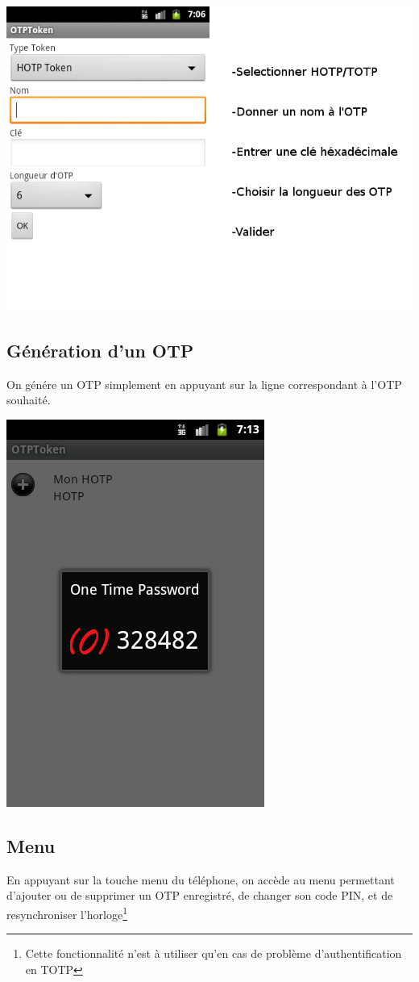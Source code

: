 \documentclass{../../../../res/univ-projet}
\begin{document}
\includegraphics[scale=0.5]{firstotp.png}

\subsection{Génération d'un OTP}
On génére un OTP simplement en appuyant sur la ligne correspondant à l'OTP souhaité.

\includegraphics[scale=0.5]{genotp.png}

\subsection{Menu}
En appuyant sur la touche menu du téléphone, on accède au menu permettant d'ajouter ou de supprimer un OTP enregistré, de changer son code PIN, et de resynchroniser l'horloge\footnote{Cette fonctionnalité n'est à utiliser qu'en cas de problème d'authentification en TOTP}
\end{document}
